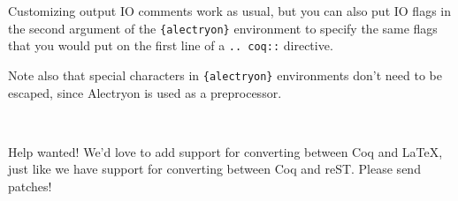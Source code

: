 \documentclass[10pt]{beamer}
\begin{document}
\begin{frame}[fragile]{Customizing output}
  IO comments work as usual, but you can also put IO flags in the second argument of the \verb|{alectryon}| environment to specify the same flags that you would put on the first line of a \verb|.. coq::| directive.

  Note also that special characters in \verb|{alectryon}| environments don't need to be escaped, since Alectryon is used as a preprocessor.



\begin{alectryon}
  \begin{\al{sentence}}
    \begin{\al{output}}
      \begin{\al{messages}}
        \begin{\al{message}}
          ~~~~~~~~
        \end{\al{message}}
      \end{\al{messages}}
    \end{\al{output}}
  \end{\al{sentence}}
\end{alectryon}
\end{frame}

\begin{frame}{Help wanted!}
  We'd love to add support for converting between Coq and LaTeX, just like we have support for converting between Coq and reST.  Please send patches!
\end{frame}
\end{document}
